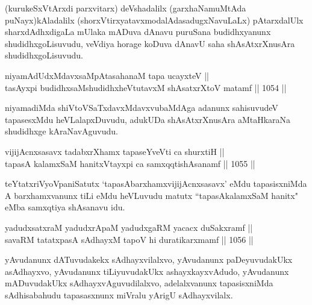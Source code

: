\begin{artha}
(kurukeSxVtArxdi parxvitarx) deVshadalilx (garxhaNamuMtAda puNayx)kAladalilx (shorxVtirxyatavxmodalAdasadugxNavuLaLx) pAtarxdalUlx sharxdAdhxdigaLa mUlaka mADuva dAnavu puruSana budidhxyanunx shudidhxgoLisuvudu, veVdiya horage koDuva dAnavU saha shAsAtxrXnusAra shudidhxgoLisuvudu.
\end{artha}


\begin{shl}
niyamAdUdxMdavxsaMpAtasahanaM tapa ucayxteV || \\
tasAyxpi budidhxsaMshudidhxheVtutavxM shAsatxrXtoV matamf \hfill || 1054 ||  
\end{shl}

\begin{artha}
niyamadiMda shiVtoVSaTxdavxMdavxvubaMdAga adanunx sahisuvudeV tapasesxMdu heVLalapxDuvudu, adukUDa shAsAtxrXnusAra aMtaHkaraNa shudidhxge kAraNavAguvudu.
\end{artha}

\begin{shl}
vijijAcnxsasavx tadabxrXhamx tapaseYveVti ca shurxtiH || \\
tapasA kalamxSaM hanitxVtayxpi ca samxqqtishAsanamf \hfill || 1055 ||  
\end{shl}

\begin{artha}
teYtatxriVyoVpaniSatutx `tapasAbarxhamxvijijAcnxsasavx' eMdu tapasisxniMda A barxhamxvanunx tiLi eMdu heVLuvudu matutx ``tapasAkalamxSaM hanitx" eMba samxqtiya shAsanavu idu.
\end{artha}


\begin{shl}
yadudxsatxraM yadudxrApaM yadudxgaRM yacacx duSakxramf || \\
savaRM tatatxpasA sAdhayxM tapoV hi duratikarxmamf \hfill || 1056 ||  
\end{shl}

\begin{artha}
yAvudanunx dATuvudakekx sAdhayxvilalxvo, yAvudanunx paDeyuvudakUkx asAdhayxvo, yAvudanunx tiLiyuvudakUkx ashayxkayxvAdudo, yAvudanunx mADuvudakUkx sAdhayxvAguvudilalxvo, adelalxvanunx tapasisxniMda sAdhisabahudu tapasasxnunx miVralu yArigU sAdhayxvilalx.
\end{artha}


